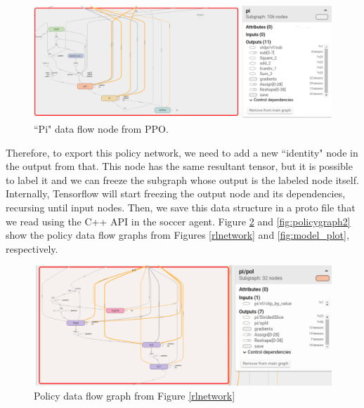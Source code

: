 \begin{figure}[!htbp]
	\centering
	\includegraphics[width=1.1\textwidth]{Cap5/pigraph.eps}
	\caption{ ``Pi" data flow node from PPO.
	}
	\label{fig:pigraph}
\end{figure}

Therefore, to export this policy network, we need to add a new ``identity" node in the output from that. This node has the same resultant tensor, but it is possible to label it and we can freeze the subgraph whose output is the labeled node itself. Internally, Tensorflow will start freezing the output node and its dependencies, recursing until input nodes. Then, we save this data structure in a proto file that we read using the C++ API in the soccer agent. Figure \ref{fig:policygraph1} and \ref{fig:policygraph2} show the policy data flow graphs from Figures \ref{rlnetwork} and \ref{fig:model_plot}, respectively.



\begin{figure}[!htbp]
	\centering
	\includegraphics[width=1.1\textwidth]{Cap5/policygraph1.eps}
	\caption{ Policy data flow graph from Figure \ref{rlnetwork}
	}
	\label{fig:policygraph1}
\end{figure}

